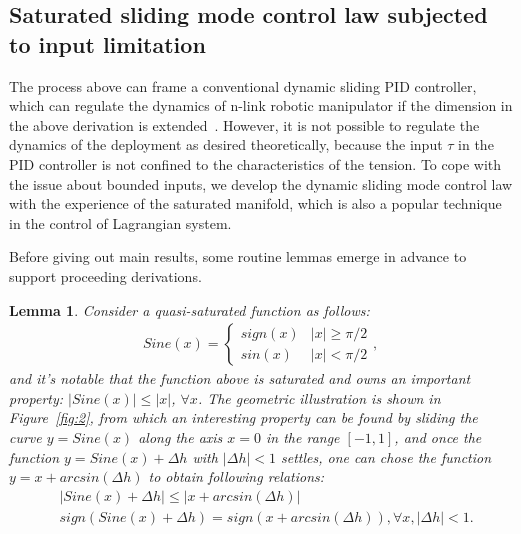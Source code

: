\documentclass[3p]{elsarticle}
\theoremstyle{plain}
\newtheorem{mylem}{Lemma}
\theoremstyle{remark}
\begin{document}
\subsection{Saturated sliding mode control law subjected to input limitation}
The process above can frame a conventional dynamic sliding PID controller, which can regulate the dynamics of n-link robotic manipulator if the dimension in the above derivation  is extended~\cite{parra2003dynamic}. However, it is not possible to regulate the dynamics of the deployment as desired theoretically, because the input $\tau$ in the PID controller is not confined to the characteristics of the tension. To cope with the issue about bounded inputs, we develop the dynamic sliding mode control law with the experience of the saturated manifold, which is also a popular technique in the control of Lagrangian system.\par
Before giving out main results, some routine lemmas emerge in advance to support proceeding derivations.
\begin{mylem}\label{lemma:1}
Consider a quasi-saturated function as follows:
\begin{align}
Sine(x) =
\begin{cases}
sign(x)&\vert x\vert\ge\pi/2\\
sin(x)&\vert x\vert<\pi/2
\end{cases},
\end{align}
and it's notable that the function above is saturated and owns an important property: $\vert Sine(x)\vert\le\vert x\vert$, $\forall x$. The geometric illustration is shown in Figure~\ref{fig:2}, from which an interesting property can be found by sliding the curve $y=Sine(x)$ along the axis $x=0$ in the range $[-1,1]$, and once the function $y=Sine(x)+\Delta h$ with $\vert\Delta h\vert<1$ settles, one can chose the function $y = x+arcsin(\Delta h)$ to obtain following relations:
\begin{align}
&\vert Sine(x)+\Delta h\vert\le\vert x+arcsin(\Delta h)\vert\label{eq:lem11}\\
&sign(Sine(x)+\Delta h)=sign(x+arcsin(\Delta h)), \forall x, \vert\Delta h\vert<1\label{eq:lem12}.
\end{align}
\end{mylem}
\end{document}
